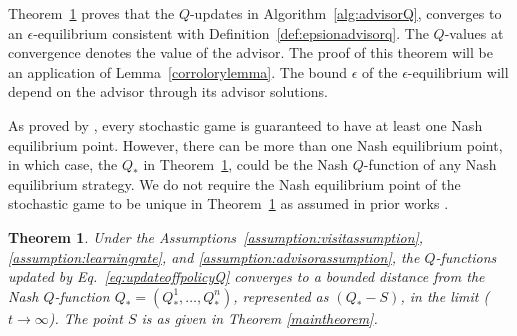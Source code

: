 \documentclass[jair, twoside,11pt,theapa]{article}
\newtheorem{theorem}{Theorem}
\begin{document}
Theorem~\ref{convergencetheorem} proves that the $Q$-updates in Algorithm~\ref{alg:advisorQ}, converges to an $\epsilon$-equilibrium consistent with Definition~\ref{def:epsionadvisorq}. The $Q$-values at convergence denotes the value of the advisor. The proof of this theorem will be an application of Lemma~\ref{corrolorylemma}. The bound $\epsilon$ of the $\epsilon$-equilibrium will depend on the advisor through its advisor solutions.  

As proved by \cite{fink1964equilibrium}, every stochastic game is guaranteed to have at least one Nash equilibrium point. However, there can be more than one Nash equilibrium point, in which case, the $Q_{*}$ in Theorem~\ref{convergencetheorem}, could be the Nash $Q$-function of any Nash equilibrium strategy. We do not require the Nash equilibrium point of the stochastic game to be unique in Theorem~\ref{convergencetheorem} as assumed in prior works \citep{hu2003nash}. 




\begin{theorem}\label{convergencetheorem}
Under the Assumptions~\ref{assumption:visitassumption}, \ref{assumption:learningrate}, and \ref{assumption:advisorassumption}, the $Q$-functions updated by Eq.~\ref{eq:updateoffpolicyQ} 
converges to a bounded distance from the Nash $Q$-function $Q_{*} = (Q^1_{*}, \ldots, Q^n_{*})$, represented as $( Q_{*} - S)$, in the limit ($t \xrightarrow{} \infty$). The point $S$ is as given in Theorem \ref{maintheorem}. 

\end{theorem}
\end{document}
